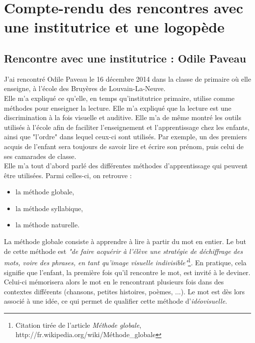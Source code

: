\appendix
\renewcommand{\thesection}{\Roman{section}}    %
\section{Compte-rendu des rencontres avec une institutrice et une logopède \label{annexeInterview}}
\subsection{Rencontre avec une institutrice : Odile Paveau}
J'ai rencontré Odile Paveau le 16 décembre 2014 dans la classe de primaire où elle enseigne, à l'école des Bruyères de Louvain-La-Neuve. \\

Elle m'a expliqué ce qu'elle, en temps qu'institutrice primaire, utilise comme méthodes pour enseigner la lecture. Elle m'a expliqué que la lecture est une discrimination à la fois visuelle et auditive. Elle m'a de même montré les outils utilisés à l'école afin de faciliter l'enseignement et l'apprentissage chez les enfants, ainsi que "l'ordre" dans lequel ceux-ci sont utilisés. Par exemple, un des premiers acquis de l'enfant sera toujours de savoir lire et écrire son prénom, puis celui de ses camarades de classe.\\

Elle m'a tout d'abord parlé des différentes méthodes d'apprentissage qui peuvent être utilisées. Parmi celles-ci, on retrouve :
\begin{itemize}
\item la méthode globale,
\item la méthode syllabique,
\item la méthode naturelle.\\
\end{itemize}

La méthode globale consiste à apprendre à lire à partir du mot en entier. Le but de cette méthode est \textit{"de faire acquérir à l'élève une stratégie de déchiffrage des mots, voire des phrases, en tant qu'image visuelle indivisible"}\footnote{Citation tirée de l'article \textit{Méthode globale}, http://fr.wikipedia.org/wiki/Méthode\_globale}. En pratique, cela signifie que l'enfant, la première fois qu'il rencontre le mot, est invité à le deviner. Celui-ci mémorisera alors le mot en le rencontrant plusieurs fois dans des contextes différents (chansons, petites histoires, poèmes, ...). Le mot est dès lors associé à une idée, ce qui permet de qualifier cette méthode d'\textit{idéovisuelle}.\\

